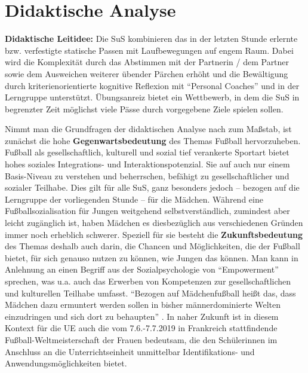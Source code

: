 \section{Didaktische Analyse}

\textbf{Didaktische Leitidee:} Die SuS kombinieren das in der letzten Stunde
erlernte bzw. verfestigte statische Passen mit Laufbewegungen auf engem Raum.
Dabei wird die Komplexität durch das Abstimmen mit der Partnerin / dem Partner
sowie dem Ausweichen weiterer übender Pärchen erhöht und die Bewältigung durch
kriterienorientierte kognitive Reflexion mit \enquote{Personal Coaches} und in
der Lerngruppe unterstützt. Übungsanreiz bietet ein Wettbewerb, in dem die SuS
in begrenzter Zeit möglichst viele Pässe durch vorgegebene Ziele spielen
sollen.

Nimmt man die Grundfragen der didaktischen Analyse nach  zum
Maßstab, ist zunächst die hohe \textbf{Gegenwartsbedeutung} des Themas Fußball
hervorzuheben. Fußball als gesellschaftlich, kulturell und sozial tief
verankerte Sportart bietet hohes soziales Integrations- und
Interaktionspotenzial. Sie auf auch nur einem Basis-Niveau zu verstehen und
beherrschen, befähigt zu gesellschaftlicher und sozialer Teilhabe. Dies gilt
für alle SuS, ganz besonders jedoch -- bezogen auf die Lerngruppe der
vorliegenden Stunde -- für die Mädchen. Während eine Fußballsozialisation für
Jungen weitgehend selbstverständlich, zumindest aber leicht zugänglich ist,
haben Mädchen es diesbezüglich aus verschiedenen Gründen immer noch erheblich
schwerer. Speziell für sie besteht die \textbf{Zukunftsbedeutung} des Themas
deshalb auch darin, die Chancen und Möglichkeiten, die der Fußball bietet, für
sich genauso nutzen zu können, wie Jungen das können. Man kann in Anlehnung an
einen Begriff aus der Sozialpsychologie von \enquote{Empowerment} sprechen, was
u.a. auch das Erwerben von Kompetenzen zur gesellschaftlichen und kulturellen
Teilhabe umfasst. \enquote{Bezogen auf Mädchenfußball heißt das, dass Mädchen
dazu ermuntert werden sollen in bisher männerdominierte Welten einzudringen und
sich dort zu behaupten} \cite[S. 13]{kugelmann2009}. In naher Zukunft ist in
diesem Kontext für die UE auch die vom 7.6.-7.7.2019 in Frankreich
stattfindende Fußball-Weltmeisterschaft der Frauen bedeutsam, die den
Schülerinnen im Anschluss an die Unterrichtseinheit unmittelbar
Identifikations- und Anwendungsmöglichkeiten bietet.

